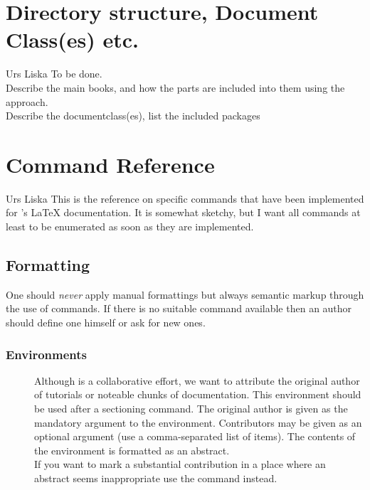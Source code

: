 \documentclass[openLilyLib_CG]{subfiles}
\begin{document}
\chapter{Directory structure, Document Class(es) etc.}

\begin{authorAbstract}{Urs Liska}
To be done.\\
Describe the main books, and how the parts are included into them using the  approach.\\
Describe the documentclass(es), list the included packages
\end{authorAbstract}




\chapter{Command Reference}
\begin{authorAbstract}{Urs Liska}
This is the reference on specific commands that have been implemented for \openlilylib's \LaTeX{} documentation.
It is somewhat sketchy, but I want all commands at least to be enumerated as soon as they are implemented.
\end{authorAbstract}

\section{Formatting}
One should \emph{never} apply manual formattings but always semantic markup through the use of commands.
If there is no suitable command available then an author should define one himself or ask for new ones.

\subsection{Environments}
\begin{description}
\item[] Although \openlilylib{} is a collaborative effort, we want to attribute the original author of tutorials or noteable chunks of documentation.
This environment should be used after a sectioning command.
The original author is given as the mandatory argument to the environment.
Contributors may be given as an optional argument (use a comma-separated list of  items).
The contents of the environment is formatted as an abstract.
\\
If you want to mark a substantial contribution in a place where an abstract seems inappropriate use the command  instead.
\end{description}
\end{document}
